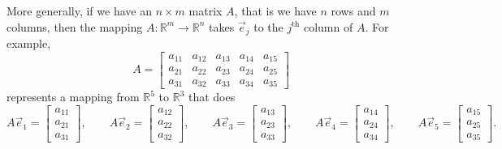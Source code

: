 More generally, if we have an $n \times m$ matrix $A$, that is we have $n$ rows
and $m$ columns, then the mapping $A \colon {\mathbb R}^m \to {\mathbb R}^n$
takes $\vec{e}_j$ to the $j^{\text{th}}$ column of $A$.
For example,
\begin{equation*}
A = 
\begin{bmatrix}
a_{11} & a_{12} & a_{13} & a_{14} & a_{15} \\
a_{21} & a_{22} & a_{23} & a_{24} & a_{25} \\
a_{31} & a_{32} & a_{33} & a_{34} & a_{35}
\end{bmatrix}
\end{equation*}
represents a mapping from ${\mathbb R}^5$ to ${\mathbb R}^3$ that does
\begin{equation*}
A \vec{e}_1 =
\begin{bmatrix}
a_{11} \\ a_{21} \\ a_{31}
\end{bmatrix} ,
\qquad
A \vec{e}_2 =
\begin{bmatrix}
a_{12} \\ a_{22} \\ a_{32}
\end{bmatrix} ,
\qquad
A \vec{e}_3 =
\begin{bmatrix}
a_{13} \\ a_{23} \\ a_{33}
\end{bmatrix} ,
\qquad
A \vec{e}_4 =
\begin{bmatrix}
a_{14} \\ a_{24} \\ a_{34}
\end{bmatrix} ,
\qquad
A \vec{e}_5 =
\begin{bmatrix}
a_{15} \\ a_{25} \\ a_{35}
\end{bmatrix} .
\end{equation*}

